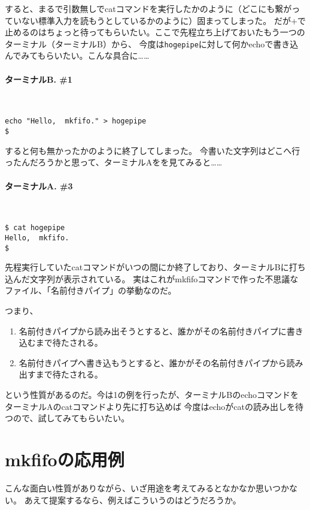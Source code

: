すると、まるで引数無しでcatコマンドを実行したかのように（どこにも繋がっていない標準入力を読もうとしているかのように）固まってしまった。
だが+で止めるのはちょっと待ってもらいたい。ここで先程立ち上げておいたもう一つのターミナル（ターミナルB）から、
今度は\verb|hogepipe|に対して何かechoで書き込んでみてもらいたい。こんな具合に……

\paragraph{ターミナルB. \#1} 　
\begin{screen}
	\verb|echo "Hello,  mkfifo." > hogepipe| \return \\
	\verb|$ |
\end{screen}

すると何も無かったかのように終了してしまった。
今書いた文字列はどこへ行ったんだろうかと思って、ターミナルAをを見てみると……

\paragraph{ターミナルA. \#3} 　
\begin{screen}
	\verb|$ cat hogepipe| \return \\
	\verb|Hello,  mkfifo.| \\
	\verb|$ |
\end{screen}

先程実行していたcatコマンドがいつの間にか終了しており、ターミナルBに打ち込んだ文字列が表示されている。
実はこれがmkfifoコマンドで作った不思議なファイル、「名前付きパイプ」の挙動なのだ。

つまり、
\begin{enumerate}
  \item 名前付きパイプから読み出そうとすると、誰かがその名前付きパイプに書き込むまで待たされる。
  \item 名前付きパイプへ書き込もうとすると、誰かがその名前付きパイプから読み出すまで待たされる。
\end{enumerate}
\noindent
という性質があるのだ。今は1の例を行ったが、ターミナルBのechoコマンドをターミナルAのcatコマンドより先に打ち込めば
今度はechoがcatの読み出しを待つので、試してみてもらいたい。

\section*{mkfifoの応用例}

こんな面白い性質がありながら、いざ用途を考えてみるとなかなか思いつかない。
あえて提案するなら、例えばこういうのはどうだろうか。

